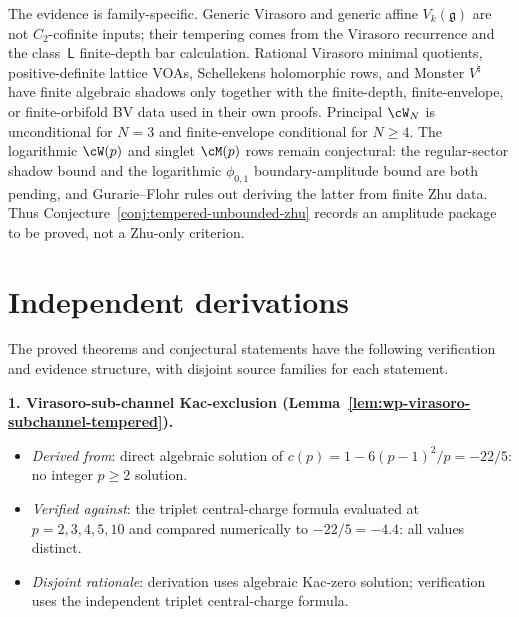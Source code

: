 \begin{remark}
\label{rem:evidence-for-tempering-criterion}
The evidence is family-specific. Generic Virasoro and generic affine
$V_k(\mathfrak g)$ are not $C_2$-cofinite inputs; their tempering comes
from the Virasoro recurrence and the class~$\mathsf L$ finite-depth
bar calculation. Rational Virasoro minimal quotients, positive-definite
lattice VOAs, Schellekens holomorphic rows, and Monster
$V^\natural$ have finite algebraic shadows only together with the
finite-depth, finite-envelope, or finite-orbifold BV data used in their
own proofs. Principal $\cW_N$ is unconditional for $N=3$ and
finite-envelope conditional for $N\ge4$. The logarithmic $\cW(p)$ and
singlet $\cM(p)$ rows remain conjectural: the regular-sector shadow
bound and the logarithmic $\phi_{0,1}$ boundary-amplitude bound are
both pending, and Gurarie--Flohr rules out deriving the latter from
finite Zhu data. Thus Conjecture~\ref{conj:tempered-unbounded-zhu}
records an amplitude package to be proved, not a Zhu-only criterion.
\end{remark}

\section{Independent derivations}
\label{sec:wp-iv-summary}

The proved theorems and conjectural statements have the following
verification and evidence structure, with disjoint source families for
each statement.

\textbf{1. Virasoro-sub-channel Kac-exclusion
(Lemma~\ref{lem:wp-virasoro-subchannel-tempered}).}
\begin{itemize}[nosep]
\item \emph{Derived from}: direct algebraic solution of
 $c(p) = 1 - 6(p-1)^2/p = -22/5$: no integer $p \ge 2$ solution.
\item \emph{Verified against}: the triplet central-charge formula
 evaluated at $p = 2, 3, 4, 5, 10$ and compared numerically to
 $-22/5 = -4.4$: all values distinct.
\item \emph{Disjoint rationale}: derivation uses algebraic Kac-zero
 solution; verification uses the independent triplet central-charge
 formula.
\end{itemize}

